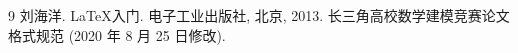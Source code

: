 
\begin{thebibliography}{9}%
    刘海洋.
    \newblock \LaTeX {}入门\allowbreak[J].
    \newblock 电子工业出版社, 北京, 2013.
    长三角高校数学建模竞赛论文格式规范 (2020 年 8 月 25 日修改).
\end{thebibliography}
